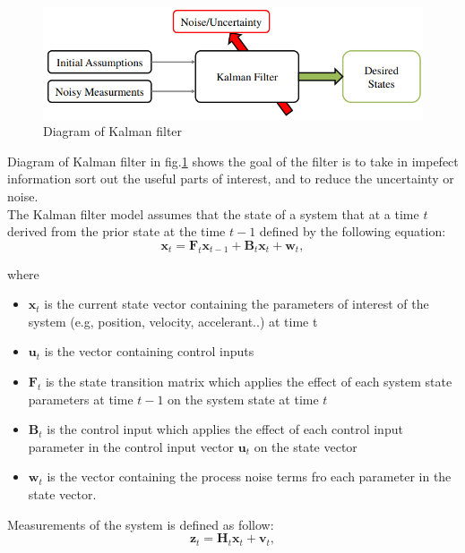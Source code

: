 \begin{figure}[h!]
        \centering
        \includegraphics[width=\textwidth]{Chapters/Fig/kalman_dig.png}
        \caption{Diagram of Kalman filter}
        \label{fig:kalman_dig}
\end{figure}\par
Diagram of Kalman filter in fig.\ref{fig:kalman_dig} shows the goal of the filter is to take in impefect information sort out the useful parts of interest, and to reduce the uncertainty or noise.\\
The Kalman filter model assumes that the state of a system that at a time $t$ derived from the prior state at the time $t-1$ defined by the following equation:
\begin{equation}
 \textbf{x}_t = \textbf{F}_t \textbf{x}_{t-1} + \textbf{B}_t \textbf{x}_t + \textbf{w}_t,
\end{equation}\par
where
\begin{itemize}
    \item $\textbf{x}_t$ is the current state vector containing the parameters of interest of the system (e.g, position, velocity, accelerant..) at time t
    \item $\textbf{u}_t$ is the vector containing control inputs
    \item $\textbf{F}_t$ is the state transition matrix which applies the effect of each system state parameters at time $t-1$ on the system state at time $t$
    \item $\textbf{B}_t$ is the control input which applies the effect of each control input parameter in the control input vector $\textbf{u}_t$ on the state vector
    \item $\textbf{w}_t$ is the vector containing the process noise terms fro each parameter in the state vector.
\end{itemize}

\hspace{0.5cm}Measurements of the system is defined as follow:
\begin{equation}
         \textbf{z}_t = \textbf{H}_t\textbf{x}_t + \textbf{v}_t,
\end{equation}

